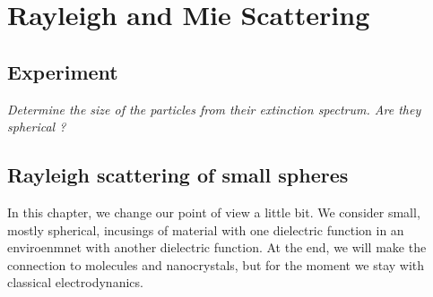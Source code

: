 

\chapter{Rayleigh and Mie Scattering}




\section{Experiment}

\textit{Determine the size of the particles from their extinction spectrum. Are they spherical ?
}


\section{Rayleigh scattering of small spheres}


In this chapter, we change our point of view a little bit. We consider small, mostly spherical, incusings of material with one dielectric function in an enviroenmnet with another dielectric function. At the end, we will make the connection to molecules and nanocrystals, but for the moment we stay with classical electrodynanics.





\printbibliography[segment=\therefsegment,heading=subbibliography]
